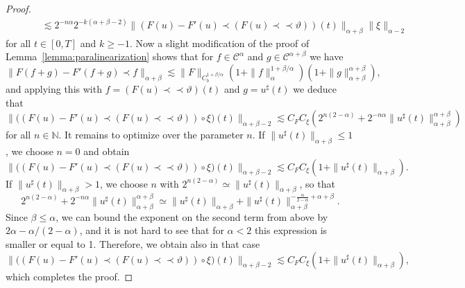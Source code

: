 \documentclass[11pt,a4paper]{article}
\newcommand{\precprec}{\prec\!\!\!\prec}
\theoremstyle{remark}
\newcommand{\N}{\mathbb{N}}
\newcommand{\CC}{\ensuremath{\mathscr{C}}}
\begin{document}
\begin{proof}
\begin{align*}
       &\hspace{30pt} \lesssim 2^{-n\alpha} 2^{-k(\alpha+\beta-2)} \|(F(u) - F'(u) \prec (F(u) \precprec \vartheta))(t)\|_{\alpha+\beta} \|\xi\|_{\alpha-2}
   \end{align*}
   for all $t \in [0,T]$ and $k \geqslant -1$. Now a slight modification of the proof of Lemma~\ref{lemma:paralinearization} shows that for $f \in \CC^\alpha$ and $g \in \CC^{\alpha+\beta}$ we have
   \[
      \|F(f+g) - F'(f+g)\prec f\|_{\alpha+\beta} \lesssim \|F\|_{C^{1+\beta/\alpha}_b} (1 + \|f\|_\alpha^{1+\beta/\alpha}) (1 + \|g\|^{\alpha+\beta}_{\alpha+\beta}),
   \]
   and applying this with $f = (F(u) \precprec \vartheta)(t)$ and $g = u^\sharp(t)$ we deduce that
   \[
      \big\| \big((F(u) - F'(u) \prec (F(u) \precprec \vartheta)) \circ \xi\big)(t)\big\|_{\alpha+\beta-2} \lesssim C_F C_\xi (2^{n(2-\alpha)} + 2^{-n\alpha} \|u^\sharp(t)\|_{\alpha+\beta}^{\alpha+\beta})
   \]
   for all $n \in \N$. It remains to optimize over the parameter $n$. If $\|u^\sharp(t)\|_{\alpha+\beta} \leqslant 1$, we choose $n=0$ and obtain
\[
   \big\| \big((F(u) - F'(u) \prec (F(u) \precprec \vartheta)) \circ \xi\big)(t)\big\|_{\alpha+\beta-2} \lesssim C_F C_\xi (1 + \|u^\sharp(t)\|_{\alpha+\beta}).
\]
If $\|u^\sharp(t)\|_{\alpha+\beta}>1$, we choose $n$ with $2^{n(2-\alpha)} \simeq \|u^\sharp(t)\|_{\alpha+\beta}$, so that
\[
   2^{n(2-\alpha)} + 2^{-n\alpha} \|u^\sharp(t)\|_{\alpha+\beta}^{\alpha+\beta} \simeq \|u^\sharp(t)\|_{\alpha+\beta} + \|u^\sharp(t)\|_{\alpha+\beta}^{-\frac{\alpha}{2-\alpha} + \alpha+\beta}.
\]
Since $\beta\leqslant \alpha$, we can bound the exponent on the second term from above by $2\alpha - \alpha/(2-\alpha)$, and it is not hard to see that for $\alpha<2$ this expression is smaller or equal to 1. Therefore, we obtain also in that case
\[
   \big\| \big((F(u) - F'(u) \prec (F(u) \precprec \vartheta)) \circ \xi\big)(t)\big\|_{\alpha+\beta-2} \lesssim C_F C_\xi (1 + \|u^\sharp(t)\|_{\alpha+\beta}),
\]
which completes the proof.
\end{proof}
\end{document}
